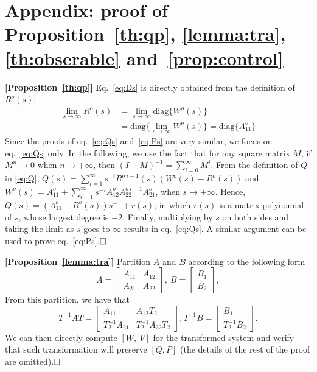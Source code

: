 \documentclass[twocolumn,12pt]{autart}
\theoremstyle{plain}
\newenvironment{proof}[1][Proof]{\begin{trivlist} \item[\hskip \labelsep {\bfseries #1}]}{\end{trivlist}}
\begin{document}
\section{Appendix: proof of Proposition~\ref{th:qp}, \ref{lemma:tra}, \ref{th:obserable} and~\ref{prop:control}}\label{sec:appendixA}
\begin{proof}\textbf{[Proposition~\ref{th:qp}]}
Eq.~\eqref{eq:Ds} is directly obtained from the definition of ${R}^o(s)$:
\begin{align*}
  \lim_{s\rightarrow\infty}{R}^o(s)&=\lim_{s\rightarrow\infty}\text{diag}\{{W}^o(s)\}\\
  &=\text{diag}\{\lim_{s\rightarrow\infty}{W}^o(s)\} =
  \text{diag}\{{A}_{11}^o\}
\end{align*}
Since the proofs of eq.~\eqref{eq:Qs} and~\eqref{eq:Ps} are very
similar, we focus on eq.~\eqref{eq:Qs} only. In the following, we use the fact that
for any square matrix ${M}$, if $M^n \rightarrow 0$ when $n\rightarrow +\infty$, then  
$({I}-{M})^{-1}=\sum_{i=0}^{\infty}{M}^i$. From the definition of ${Q}$ in \eqref{eq:Q},
${Q}(s)=\sum_{i=1}^{\infty}
s^{-i}{R}^{o~i-1}(s)\left({W}^o(s)-{R}^o(s)\right)$ and
${W}^o(s)={A}^o_{11}+\sum_{i=1}^{\infty}s^{-i}{A}^o_{12}{A}_{22}^{o~i-1}{A}^o_{21}$, when $s\rightarrow+\infty$.
Hence,
${Q}(s)=({A}^o_{11}-{R}^o(s))s^{-1}+{r}(s)$, in
which ${r}(s)$ is a matrix polynomial of $s$, whose largest degree is
$-2$. Finally, multiplying by $s$ on both sides and taking the limit
as $s$ goes to $\infty$ results in eq.~\eqref{eq:Qs}.  A similar
argument can be used to prove eq.~\eqref{eq:Ps}.$\hfill \square$
\end{proof}


\begin{proof}\textbf{[Proposition~\ref{lemma:tra}]}
Partition $A$ and $B$ according to the following form
$$A=\begin{bmatrix}{A}_{11}&{A}_{12}\\{A}_{21}&{A}_{22}\end{bmatrix},~ B=\begin{bmatrix}   B_1 \\B_2
\end{bmatrix},$$
From this partition, we have that 
$$T^{-1}AT=\begin{bmatrix}{A}_{11}&{A}_{12}T_2\\T_2^{-1}{A}_{21}&T_2^{-1}{A}_{22}T_2\end{bmatrix} ,T^{-1}B=\begin{bmatrix}   B_1 \\T_2^{-1}B_2
\end{bmatrix}.$$
We can then directly compute $[W,~V]$ for the transformed system and verify that such transformation will preserve $[Q,P]$ (the details of the rest of the proof are omitted).$\hfill \square$
\end{proof}
\end{document}
